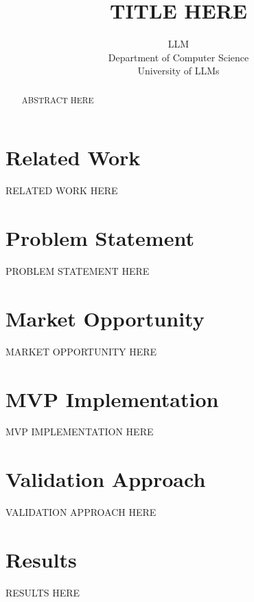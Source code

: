 \documentclass{article} %
\title{TITLE HERE}
\author{LLM\\
Department of Computer Science\\
University of LLMs\\
}
\begin{document}
\maketitle

\begin{abstract}
ABSTRACT HERE
\end{abstract}

\section{Related Work}
\label{sec:related_work}
RELATED WORK HERE

\section{Problem Statement}
\label{sec:problem}
PROBLEM STATEMENT HERE

\section{Market Opportunity}
\label{sec:market_opportunity}
MARKET OPPORTUNITY HERE

\section{MVP Implementation}
\label{sec:mvp_implementation}
MVP IMPLEMENTATION HERE



\section{Validation Approach}
\label{sec:validation_approach}
VALIDATION APPROACH HERE

\section{Results}
\label{sec:results}
RESULTS HERE
\end{document}
